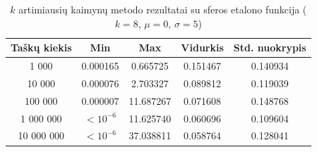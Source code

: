 \begin{table}[H]
    \centering
    \begin{tabular}{|c|c|c|c|c|}
        \hline
        \textbf{Taškų kiekis} & \textbf{Min} & \textbf{Max} & \textbf{Vidurkis} & \textbf{Std. nuokrypis} \\ \hline
        1 000        & 0.000165 & 0.665725 & 0.151467 & 0.140934 \\ \hline
        10 000       & 0.000076 & 2.703327 & 0.089812 & 0.119039 \\ \hline
        100 000      & 0.000007 & 11.687267 & 0.071608 & 0.148768 \\ \hline
        1 000 000    & $<10^{-6}$ & 11.625740 & 0.060696 & 0.109604 \\ \hline
        10 000 000   & $<10^{-6}$ & 37.038811 & 0.058764 & 0.128041 \\ \hline
    \end{tabular}
    \caption{$k$ artimiausių kaimynų metodo rezultatai su sferos etalono funkcija ($k = 8$, $\mu = 0$, $\sigma = 5$)}
\end{table}